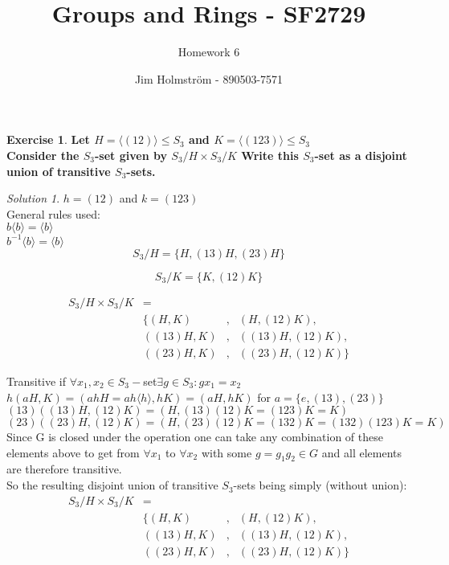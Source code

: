 \documentclass[a4paper,twoside=false,abstract=false,numbers=noenddot,
titlepage=false,headings=small,parskip=half,version=last]{scrartcl}
\author{Jim Holmström - 890503-7571}
\title{Groups and Rings - SF2729}
\subtitle{Homework 6}
\theoremstyle{definition}
\newtheorem{exercise}{Exercise}
\theoremstyle{remark}
\newtheorem*{solution}{Solution}
\begin{document}
\maketitle
\thispagestyle{empty}

\begin{exercise}
{\bf
Let $H=\langle (12) \rangle \le S_3$ and $K=\langle (123) \rangle \le S_3$\\
Consider the $S_3$-set given by $S_3/H \times S_3/K$ Write this $S_3$-set as a
disjoint union of transitive $S_3$-sets.
}
\end{exercise}
\begin{solution}

$h=(12)$ and $k=(123)$ \\

General rules used:\\
$b\langle b \rangle=\langle b \rangle$\\
$b^{-1}\langle b \rangle=\langle b \rangle$\\


\begin{equation*}
    S_3/H=\{H,(13)H,(23)H\}
\end{equation*}

\begin{equation*}
    S_3/K=\{K,(12)K\}
\end{equation*}

\begin{align*}
    S_3/H \times S_3/K  &=        & &\\
                        &\{  (H,K)&,& (    H,(12)K), \\
                        &((13)H,K)&,& ((13)H,(12)K), \\
                        &((23)H,K)&,& ((23)H,(12)K)\}
\end{align*}

Transitive if $\forall x_1,x_2 \in S_3-$set$\exists g \in S_3 : gx_1 = x_2$\\

$h(aH,K)=(ahH=ah\langle h\rangle ,hK)=(aH,hK)$ for $a=\{e,(13),(23)\}$\\
$(13)((13)H,(12)K)=(H,(13)(12)K=(123)K=K)$\\
$(23)((23)H,(12)K)=(H,(23)(12)K=(132)K=(132)(123)K=K)$ \\
Since G is closed under the operation one can take any combination of these
elements above to get from $\forall x_1$ to $\forall x_2$ with some $g=g_1g_2
\in G$ and all elements are therefore transitive.\\

So the resulting disjoint union of transitive $S_3$-sets being simply (without
union): \\
\begin{align*}
    S_3/H \times S_3/K  &=        & &\\
                        &\{  (H,K)&,& (    H,(12)K), \\
                        &((13)H,K)&,& ((13)H,(12)K), \\
                        &((23)H,K)&,& ((23)H,(12)K)\}
\end{align*}



\end{solution}

\end{document}
